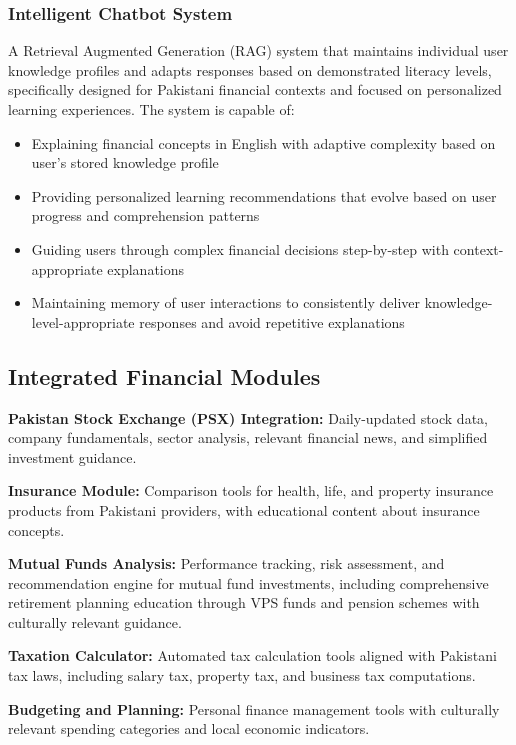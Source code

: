 \documentclass[12pt]{article}
\begin{document}
\subsubsection{Intelligent Chatbot System}
A Retrieval Augmented Generation (RAG) system that maintains individual user knowledge profiles and adapts responses based on demonstrated literacy levels, specifically designed for Pakistani financial contexts and focused on personalized learning experiences. The system is capable of:
\begin{itemize}
    \item Explaining financial concepts in English with adaptive complexity based on user's stored knowledge profile
    \item Providing personalized learning recommendations that evolve based on user progress and comprehension patterns
    \item Guiding users through complex financial decisions step-by-step with context-appropriate explanations
    \item Maintaining memory of user interactions to consistently deliver knowledge-level-appropriate responses and avoid repetitive explanations
\end{itemize}

\subsection{Integrated Financial Modules}

\textbf{Pakistan Stock Exchange (PSX) Integration:} Daily-updated stock data, company fundamentals, sector analysis, relevant financial news, and simplified investment guidance.

\textbf{Insurance Module:} Comparison tools for health, life, and property insurance products from Pakistani providers, with educational content about insurance concepts.

\textbf{Mutual Funds Analysis:} Performance tracking, risk assessment, and recommendation engine for mutual fund investments, including comprehensive retirement planning education through VPS funds and pension schemes with culturally relevant guidance.

\textbf{Taxation Calculator:} Automated tax calculation tools aligned with Pakistani tax laws, including salary tax, property tax, and business tax computations.

\textbf{Budgeting and Planning:} Personal finance management tools with culturally relevant spending categories and local economic indicators.
\end{document}
